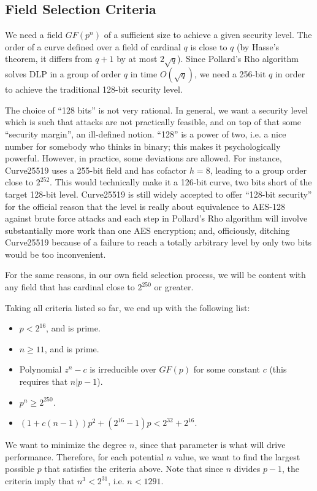 \documentclass{llncs}
\newcommand{\GF}{GF}
\begin{document}
\subsection{Field Selection Criteria}

We need a field $\GF(p^n)$ of a sufficient size to achieve a given
security level. The order of a curve defined over a field of cardinal
$q$ is close to $q$ (by Hasse's theorem, it differs from $q+1$ by at
most $2\sqrt{q}$). Since Pollard's Rho algorithm solves DLP in a group
of order $q$ in time $O(\sqrt{q})$, we need a 256-bit $q$ in order to
achieve the traditional 128-bit security level.

The choice of ``128 bits'' is not very rational. In general, we want a
security level which is such that attacks are not practically feasible,
and on top of that some ``security margin'', an ill-defined notion.
``128'' is a power of two, i.e. a nice number for somebody who thinks in
binary; this makes it psychologically powerful. However, in practice,
some deviations are allowed. For instance, Curve25519 uses a 255-bit
field and has cofactor $h = 8$, leading to a group order close to
$2^{252}$. This would technically make it a 126-bit curve, two bits
short of the target 128-bit level. Curve25519 is still widely accepted
to offer ``128-bit security'' for the official reason that the level is
really about equivalence to AES-128 against brute force attacks and each
step in Pollard's Rho algorithm will involve substantially more work
than one AES encryption; and, officiously, ditching Curve25519 because
of a failure to reach a totally arbitrary level by only two bits would
be too inconvenient.

For the same reasons, in our own field selection process, we will be
content with any field that has cardinal close to $2^{250}$ or greater.

Taking all criteria listed so far, we end up with the following list:
\begin{itemize}

    \item $p < 2^{16}$, and is prime.
    \item $n \geq 11$, and is prime.
    \item Polynomial $z^n-c$ is irreducible over $\GF(p)$ for some
    constant $c$ (this requires that $n | p-1$).
    \item $p^n \geq 2^{250}$.
    \item $(1 + c(n-1)) p^2 + (2^{16}-1)p < 2^{32}+2^{16}$.

\end{itemize}
We want to minimize the degree $n$, since that parameter is what will
drive performance. Therefore, for each potential $n$ value, we want
to find the largest possible $p$ that satisfies the criteria above.
Note that since $n$ divides $p-1$, the criteria imply that
$n^3 < 2^{31}$, i.e. $n < 1291$.
\end{document}
